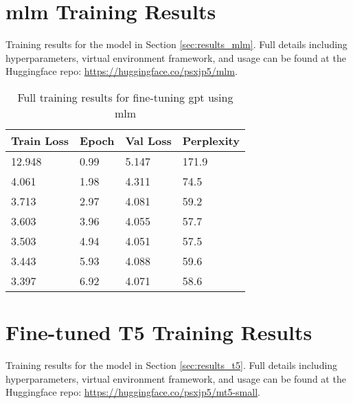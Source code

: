 \begin{appendices}


\chapter{\acrshort{mlm} Training Results}\label{ch:appendixA} %
Training results for the model in Section \ref{sec:results_mlm}. Full details including hyperparameters, virtual environment framework, and usage can be found at the Huggingface repo: \url{https://huggingface.co/psxjp5/mlm}.

\begin{table}[!ht]
\begin{adjustwidth}{-1.8cm}{}
  \centering
\begin{tabular}{l|l|l|l}
        \textbf{Train Loss} & \textbf{Epoch} & \textbf{Val Loss} & \textbf{Perplexity} \\ \hline
        12.948 & 0.99 & 5.147 & 171.9 \\ \hline
        4.061 & 1.98 & 4.311 & 74.5 \\ \hline
        3.713 & 2.97 & 4.081 & 59.2 \\ \hline
        3.603 & 3.96 & 4.055 & 57.7 \\ \hline
        3.503 & 4.94 & 4.051 & 57.5 \\ \hline
        3.443 & 5.93 & 4.088 & 59.6 \\ \hline
        3.397 & 6.92 & 4.071 & 58.6 \\
    \end{tabular}
  \caption{Full training results for fine-tuning \acrshort{gpt} using \acrlong{mlm}}
  \label{tab:longheaders}
\end{adjustwidth}
\end{table}

\chapter{Fine-tuned T5 Training Results}\label{ch:appendixB} %
Training results for the model in Section \ref{sec:results_t5}. Full details including hyperparameters, virtual environment framework, and usage can be found at the Huggingface repo: \url{https://huggingface.co/psxjp5/mt5-small}.


\end{appendices}
